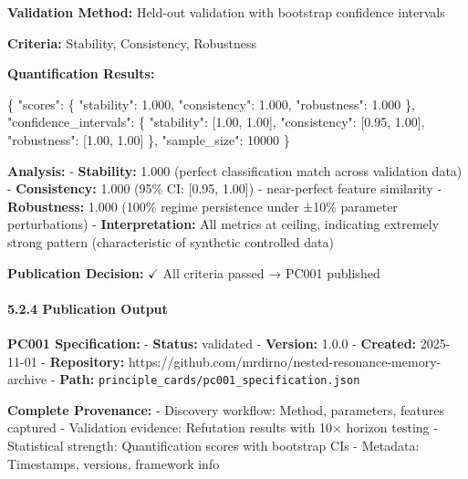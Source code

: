 \documentclass[
]{article}
\newenvironment{Shaded}{}{}
\newcommand{\DataTypeTok}[1]{\textcolor[rgb]{0.56,0.13,0.00}{#1}}
\newcommand{\DecValTok}[1]{\textcolor[rgb]{0.25,0.63,0.44}{#1}}
\newcommand{\FloatTok}[1]{\textcolor[rgb]{0.25,0.63,0.44}{#1}}
\newcommand{\FunctionTok}[1]{\textcolor[rgb]{0.02,0.16,0.49}{#1}}
\newcommand{\OtherTok}[1]{\textcolor[rgb]{0.00,0.44,0.13}{#1}}
\begin{document}
\textbf{Validation Method:} Held-out validation with bootstrap
confidence intervals

\textbf{Criteria:} Stability, Consistency, Robustness

\textbf{Quantification Results:}

\begin{Shaded}
\begin{Highlighting}[]
\FunctionTok{\{}
  \DataTypeTok{"scores"}\FunctionTok{:} \FunctionTok{\{}
    \DataTypeTok{"stability"}\FunctionTok{:} \FloatTok{1.000}\FunctionTok{,}
    \DataTypeTok{"consistency"}\FunctionTok{:} \FloatTok{1.000}\FunctionTok{,}
    \DataTypeTok{"robustness"}\FunctionTok{:} \FloatTok{1.000}
  \FunctionTok{\},}
  \DataTypeTok{"confidence\_intervals"}\FunctionTok{:} \FunctionTok{\{}
    \DataTypeTok{"stability"}\FunctionTok{:} \OtherTok{[}\FloatTok{1.00}\OtherTok{,} \FloatTok{1.00}\OtherTok{]}\FunctionTok{,}
    \DataTypeTok{"consistency"}\FunctionTok{:} \OtherTok{[}\FloatTok{0.95}\OtherTok{,} \FloatTok{1.00}\OtherTok{]}\FunctionTok{,}
    \DataTypeTok{"robustness"}\FunctionTok{:} \OtherTok{[}\FloatTok{1.00}\OtherTok{,} \FloatTok{1.00}\OtherTok{]}
  \FunctionTok{\},}
  \DataTypeTok{"sample\_size"}\FunctionTok{:} \DecValTok{10000}
\FunctionTok{\}}
\end{Highlighting}
\end{Shaded}

\textbf{Analysis:} - \textbf{Stability:} 1.000 (perfect classification
match across validation data) - \textbf{Consistency:} 1.000 (95\% CI:
{[}0.95, 1.00{]}) - near-perfect feature similarity -
\textbf{Robustness:} 1.000 (100\% regime persistence under ±10\%
parameter perturbations) - \textbf{Interpretation:} All metrics at
ceiling, indicating extremely strong pattern (characteristic of
synthetic controlled data)

\textbf{Publication Decision:} $\checkmark$ All criteria passed → PC001 published

\paragraph{5.2.4 Publication Output}\label{publication-output}

\textbf{PC001 Specification:} - \textbf{Status:} validated -
\textbf{Version:} 1.0.0 - \textbf{Created:} 2025-11-01 -
\textbf{Repository:}
https://github.com/mrdirno/nested-resonance-memory-archive -
\textbf{Path:} \texttt{principle\_cards/pc001\_specification.json}

\textbf{Complete Provenance:} - Discovery workflow: Method, parameters,
features captured - Validation evidence: Refutation results with 10×
horizon testing - Statistical strength: Quantification scores with
bootstrap CIs - Metadata: Timestamps, versions, framework info
\end{document}
